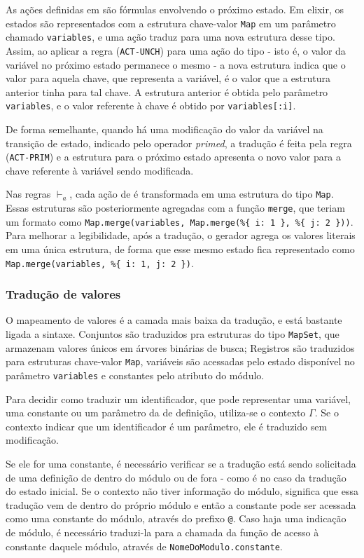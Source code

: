 As ações definidas em \TLA são fórmulas envolvendo o próximo estado. Em elixir,
os estados são representados com a estrutura chave-valor \texttt{Map} em um parâmetro chamado \texttt{variables}, e uma
ação traduz para uma nova estrutura desse tipo. Assim, ao aplicar a regra (\texttt{ACT-UNCH}) para uma ação do
tipo \UNCHANGED - isto é, o valor da variável no próximo estado permanece o
mesmo - a nova estrutura indica que o valor para aquela chave, que representa a
variável, é o valor que a estrutura anterior tinha para tal chave. A
estrutura anterior é obtida pelo parâmetro \texttt{variables}, e o valor referente à
chave \tti é obtido por \texttt{variables[:i]}.

De forma semelhante, quando há uma modificação do valor da variável na transição
de estado, indicado pelo operador \textit{primed}, a tradução é feita pela regra
(\texttt{ACT-PRIM}) e a estrutura para o próximo estado apresenta o
novo valor para a chave referente à variável sendo modificada.

Nas regras $\vdash_a$, cada ação de \TLA é transformada em uma estrutura do tipo
\texttt{Map}. Essas estruturas são posteriormente agregadas com a função
\texttt{merge}, que teriam um formato como \texttt{Map.merge(variables, Map.merge(\%\{ i: 1 \}, \%\{
  j: 2 \}))}. Para melhorar a legibilidade, após a tradução, o gerador agrega os
valores literais em uma única estrutura, de forma que esse mesmo estado fica
representado como \texttt{Map.merge(variables, \%\{ i: 1, j: 2 \})}.

\subsubsection{Tradução de valores}



O mapeamento de valores é a camada mais baixa da tradução, e está bastante
ligada a sintaxe. Conjuntos são traduzidos pra estruturas do tipo
\texttt{MapSet}, que armazenam valores únicos em árvores binárias de busca;
Registros são traduzidos para estruturas chave-valor \texttt{Map}, variáveis
são acessadas pelo estado disponível no parâmetro \texttt{variables} e
constantes pelo atributo do módulo.

Para decidir como traduzir um identificador, que pode representar uma variável,
uma constante ou um parâmetro da de definição, utiliza-se o contexto $\Gamma$.
Se o contexto indicar que um identificador é um parâmetro, ele é traduzido sem
modificação.

Se ele for uma constante, é necessário verificar se a tradução está
sendo solicitada de uma definição de dentro do módulo ou de fora - como é no
caso da tradução do estado inicial. Se o contexto não tiver informação do
módulo, significa que essa tradução vem de dentro do próprio módulo e então a
constante pode ser acessada como uma constante do módulo, através do prefixo
\texttt{@}. Caso haja uma indicação de módulo, é necessário traduzi-la para a
chamada da função de acesso à constante daquele módulo, através de
\texttt{NomeDoModulo.constante}.

